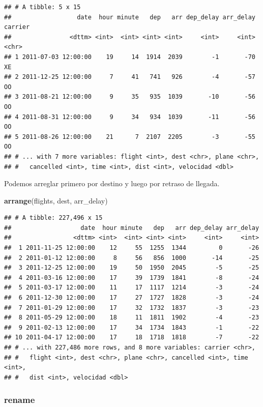 \documentclass[]{article}
\newenvironment{Shaded}{\begin{snugshade}}{\end{snugshade}}
\newcommand{\KeywordTok}[1]{\textcolor[rgb]{0.13,0.29,0.53}{\textbf{#1}}}
\newcommand{\NormalTok}[1]{#1}
\begin{document}
\begin{verbatim}
## # A tibble: 5 x 15
##                  date  hour minute   dep   arr dep_delay arr_delay carrier
##                <dttm> <int>  <int> <int> <int>     <int>     <int>   <chr>
## 1 2011-07-03 12:00:00    19     14  1914  2039        -1       -70      XE
## 2 2011-12-25 12:00:00     7     41   741   926        -4       -57      OO
## 3 2011-08-21 12:00:00     9     35   935  1039       -10       -56      OO
## 4 2011-08-31 12:00:00     9     34   934  1039       -11       -56      OO
## 5 2011-08-26 12:00:00    21      7  2107  2205        -3       -55      OO
## # ... with 7 more variables: flight <int>, dest <chr>, plane <chr>,
## #   cancelled <int>, time <int>, dist <int>, velocidad <dbl>
\end{verbatim}

Podemos arreglar primero por destino y luego por retraso de llegada.

\begin{Shaded}
\begin{Highlighting}[]
\KeywordTok{arrange}\NormalTok{(flights, dest, arr_delay)}
\end{Highlighting}
\end{Shaded}

\begin{verbatim}
## # A tibble: 227,496 x 15
##                   date  hour minute   dep   arr dep_delay arr_delay
##                 <dttm> <int>  <int> <int> <int>     <int>     <int>
##  1 2011-11-25 12:00:00    12     55  1255  1344         0       -26
##  2 2011-01-12 12:00:00     8     56   856  1000       -14       -25
##  3 2011-12-25 12:00:00    19     50  1950  2045        -5       -25
##  4 2011-03-16 12:00:00    17     39  1739  1841        -8       -24
##  5 2011-03-17 12:00:00    11     17  1117  1214        -3       -24
##  6 2011-12-30 12:00:00    17     27  1727  1828        -3       -24
##  7 2011-01-29 12:00:00    17     32  1732  1837        -3       -23
##  8 2011-05-29 12:00:00    18     11  1811  1902        -4       -23
##  9 2011-02-13 12:00:00    17     34  1734  1843        -1       -22
## 10 2011-04-17 12:00:00    17     18  1718  1818        -7       -22
## # ... with 227,486 more rows, and 8 more variables: carrier <chr>,
## #   flight <int>, dest <chr>, plane <chr>, cancelled <int>, time <int>,
## #   dist <int>, velocidad <dbl>
\end{verbatim}

\subsubsection{rename}\label{rename}
\end{document}
